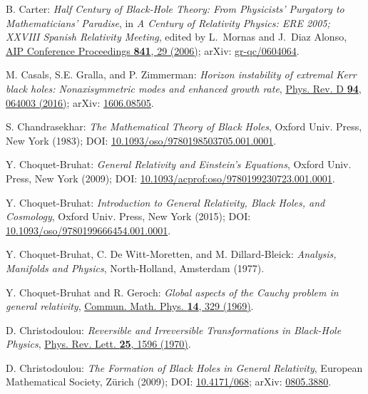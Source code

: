 \begin{thebibliography}{123}
B. Carter:
{\em Half Century of Black‐Hole Theory: From Physicists' Purgatory to Mathematicians' Paradise},
in {\em A Century of Relativity Physics: ERE 2005; XXVIII Spanish Relativity Meeting},
edited by L.~Mornas and J.~Diaz Alonso,
\href{https://doi.org/10.1063/1.2218167}{AIP Conference Proceedings {\bf 841}, 29 (2006)};
arXiv: \href{https://arxiv.org/abs/gr-qc/0604064}{gr-qc/0604064}.

M. Casals, S.E. Gralla, and P. Zimmerman:
{\em Horizon instability of extremal Kerr black holes: Nonaxisymmetric modes and enhanced growth rate},
\href{https://doi.org/10.1103/PhysRevD.94.064003}{Phys. Rev. D {\bf 94}, 064003 (2016)};
arXiv: \href{https://arxiv.org/abs/1606.08505}{1606.08505}.

S. Chandrasekhar: {\em The Mathematical Theory of Black Holes},
Oxford Univ. Press, New York (1983);
DOI: \href{https://doi.org/10.1093/oso/9780198503705.001.0001}{10.1093/oso/9780198503705.001.0001}.

Y. Choquet-Bruhat: {\em General Relativity and Einstein's Equations},
Oxford Univ. Press, New York (2009);
DOI: \href{https://doi.org/10.1093/acprof:oso/9780199230723.001.0001}{10.1093/acprof:oso/9780199230723.001.0001}.

Y. Choquet-Bruhat: {\em Introduction to General Relativity, Black Holes, and
Cosmology}, Oxford Univ. Press, New York (2015);
DOI: \href{https://doi.org/10.1093/oso/9780199666454.001.0001}{10.1093/oso/9780199666454.001.0001}.

Y. Choquet-Bruhat, C. De Witt-Moretten, and M. Dillard-Bleick:
{\em Analysis, Manifolds and Physics},
North-Holland, Amsterdam (1977).

Y. Choquet-Bruhat and R. Geroch:
{\em Global aspects of the Cauchy problem in general relativity},
\href{https://doi.org/10.1007/BF01645389}{Commun. Math. Phys. {\bf 14}, 329 (1969)}.

D. Christodoulou:
{\em Reversible and Irreversible Transformations in Black-Hole Physics},
\href{https://doi.org/10.1103/PhysRevLett.25.1596}{Phys. Rev. Lett. {\bf 25}, 1596 (1970)}.

D. Christodoulou:
{\em The Formation of Black Holes in General Relativity},
European Mathematical Society, Zürich (2009);
DOI: \href{https://doi.org/10.4171/068}{10.4171/068};
arXiv: \href{https://arxiv.org/abs/0805.3880}{0805.3880}.


\end{thebibliography}
